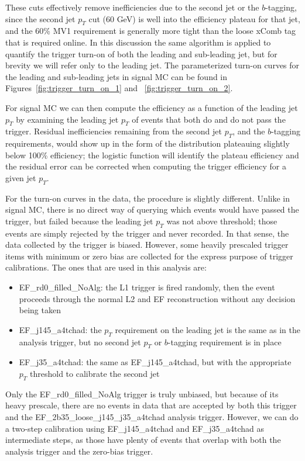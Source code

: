 These cuts effectively remove inefficiencies due to the second jet or the $b$-tagging,
since the second jet $p_T$ cut (60 GeV) is well into the efficiency plateau for that
jet, and the 60\% MV1 requirement is generally more tight than the loose xComb tag
that is required online.  In this discussion the same algorithm is applied to quantify
the trigger turn-on of both the leading and sub-leading jet, but for brevity we will
refer only to the leading jet.  The parameterized turn-on curves for the leading and 
sub-leading jets in signal MC can be found in Figures~\ref{fig:trigger_turn_on_1} and 
~\ref{fig:trigger_turn_on_2}.

For signal MC we can then compute the efficiency as a function of the leading jet $p_T$ by
examining the leading jet $p_T$ of events that both do and do not pass the trigger.
Residual inefficiencies remaining from the second jet $p_T$, and the $b$-tagging requirements,
would show up in the form of the distribution plateauing slightly below 100\% efficiency;
the logistic function will identify the plateau efficiency and the residual error can be corrected when
computing the trigger efficiency for a given jet $p_T$.   

For the turn-on curves in the data, the procedure is slightly different.  Unlike in signal
MC, there is no direct way of querying which events would have passed the trigger, but failed
because the leading jet $p_T$ was not above threshold; those events are simply rejected by 
the trigger and never recorded.  In that sense, the data collected by the trigger is biased.
However, some heavily prescaled trigger items with minimum or zero bias are collected for 
the express purpose of trigger calibrations.  The ones that are used in this analysis are:

\begin{itemize}
    \item EF\_rd0\_filled\_NoAlg: the L1 trigger is fired randomly, then the event proceeds
    through the normal L2 and EF reconstruction without any decision being taken
    \item EF\_j145\_a4tchad: the $p_T$ requirement on the leading jet is the same as in 
    the analysis trigger, but no second jet $p_T$ or $b$-tagging requirement is in place
    \item EF\_j35\_a4tchad: the same as EF\_j145\_a4tchad, but with the appropriate $p_T$ 
    threshold to calibrate the second jet
\end{itemize}

Only the EF\_rd0\_filled\_NoAlg trigger is truly unbiased, but because of its heavy prescale,
there are no events in data that are accepted by both this trigger and the EF\_2b35\_loose\_j145\_j35\_a4tchad
analysis trigger.  However, we can do a two-step calibration using EF\_j145\_a4tchad and
EF\_j35\_a4tchad as intermediate steps, as those have plenty of events that overlap 
with both the analysis trigger and the zero-bias trigger.

